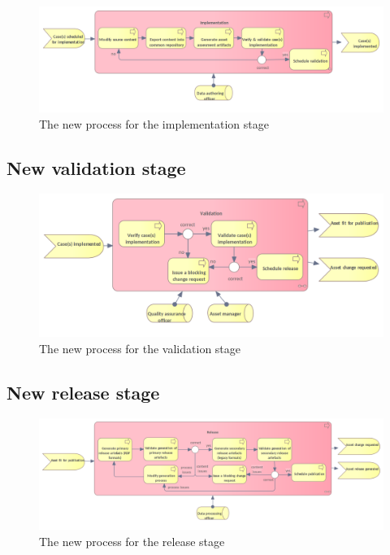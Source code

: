 	\begin{figure}[h]
		\centering
		\includegraphics[width=1.05\textwidth]{images/business/new/Implementation.png}
		\caption{The new process for the implementation stage}
		\label{fig:implementation-new}
	\end{figure} 		
	
	\subsection{New validation stage}
	\label{sec:validation-new}	

	\begin{figure}[h]
		\centering
		\includegraphics[width=.9\textwidth]{images/business/new/Validation.png}
		\caption{The new process for the validation stage}
		\label{fig:validation-new}
	\end{figure} 		
	
	\subsection{New release stage}
	\label{sec:release-new}
	
	\begin{figure}[h]
		\centering
		\includegraphics[width=1.05\textwidth]{images/business/new/Release.png}
		\caption{The new process for the release stage}
		\label{fig:release-new}
	\end{figure}